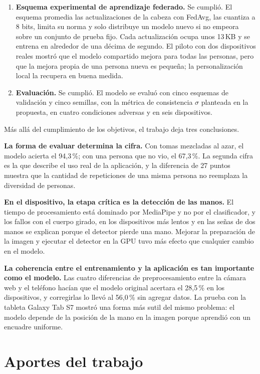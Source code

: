 \begin{enumerate}
    \item \textbf{Esquema experimental de aprendizaje federado.} Se cumplió. El esquema promedia las actualizaciones de la cabeza con FedAvg, las cuantiza a 8 bits, limita su norma y solo distribuye un modelo nuevo si no empeora sobre un conjunto de prueba fijo. Cada actualización ocupa unos 13\,KB y se entrena en alrededor de una décima de segundo. El piloto con dos dispositivos reales mostró que el modelo compartido mejora para todas las personas, pero que la mejora propia de una persona nueva es pequeña; la personalización local la recupera en buena medida.

    \item \textbf{Evaluación.} Se cumplió. El modelo se evaluó con cinco esquemas de validación y cinco semillas, con la métrica de consistencia $\sigma$ planteada en la propuesta, en cuatro condiciones adversas y en seis dispositivos.
\end{enumerate}

Más allá del cumplimiento de los objetivos, el trabajo deja tres conclusiones.

\textbf{La forma de evaluar determina la cifra.} Con tomas mezcladas al azar, el modelo acierta el 94,3\,\%; con una persona que no vio, el 67,3\,\%. La segunda cifra es la que describe el uso real de la aplicación, y la diferencia de 27 puntos muestra que la cantidad de repeticiones de una misma persona no reemplaza la diversidad de personas.

\textbf{En el dispositivo, la etapa crítica es la detección de las manos.} El tiempo de procesamiento está dominado por MediaPipe y no por el clasificador, y los fallos con el cuerpo girado, en los dispositivos más lentos y en las señas de dos manos se explican porque el detector pierde una mano. Mejorar la preparación de la imagen y ejecutar el detector en la GPU tuvo más efecto que cualquier cambio en el modelo.

\textbf{La coherencia entre el entrenamiento y la aplicación es tan importante como el modelo.} Las cuatro diferencias de preprocesamiento entre la cámara web y el teléfono hacían que el modelo original acertara el 28,5\,\% en los dispositivos, y corregirlas lo llevó al 56,0\,\% sin agregar datos. La prueba con la tableta Galaxy Tab S7 mostró una forma más sutil del mismo problema: el modelo depende de la posición de la mano en la imagen porque aprendió con un encuadre uniforme.

\section{Aportes del trabajo}

